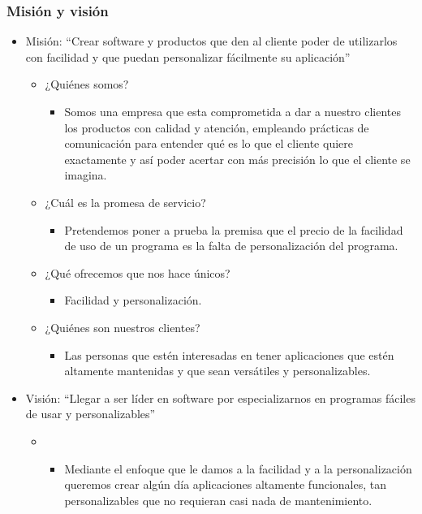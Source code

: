 \documentclass{article}
\begin{document}
\subsubsection{Misión y visión}
\begin{itemize}
    \item Misión: ``Crear software y productos que den al cliente poder de utilizarlos con facilidad y que puedan personalizar fácilmente su aplicación''
        \begin{itemize}
            \item ¿Quiénes somos?
                \begin{itemize}
                    \item Somos una empresa que esta comprometida a dar a nuestro clientes los productos con calidad y atención, empleando prácticas de comunicación para entender qué es lo que el cliente quiere exactamente y así poder acertar con más precisión lo que el cliente se imagina. 
                \end{itemize}
                
            \item ¿Cuál es la promesa de servicio?
                \begin{itemize}
                    \item Pretendemos poner a prueba la premisa que el precio de la facilidad de uso de un programa es la falta de personalización del programa.
                \end{itemize}
                
            \item ¿Qué ofrecemos que nos hace únicos?
                \begin{itemize}
                    \item Facilidad y personalización.
                \end{itemize}
                
            \item ¿Quiénes son nuestros clientes?
                \begin{itemize}
                    \item Las personas que estén interesadas en tener aplicaciones que estén altamente mantenidas y que sean versátiles y personalizables.
                \end{itemize}
        \end{itemize}
    
    \item Visión: ``Llegar a ser líder en software por especializarnos en programas fáciles de usar y personalizables''
        \begin{itemize}
            \item {} 
                \begin{itemize}
                    \item Mediante el enfoque que le damos a la facilidad y a la personalización queremos crear algún día aplicaciones altamente funcionales, tan personalizables que no requieran casi nada de mantenimiento. 
                \end{itemize}
                

\end{itemize}
\end{itemize}
\end{document}
